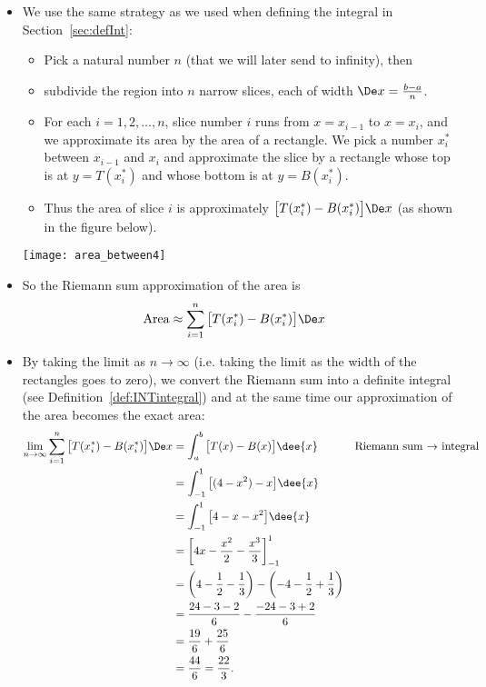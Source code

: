 \begin{eg}
\begin{itemize}
\item We use the same strategy as we used when defining the integral in
Section~\ref{sec:defInt}:
\begin{itemize}
 \item Pick a natural number $n$ (that we will later send to infinity), then
\item subdivide the region into $n$ narrow slices, each of width $\De x=\frac{b-a}{n}$.
\item For each $i=1,2,\dots,n$, slice number $i$ runs from $x=x_{i-1}$ to $x=x_i$, and we
approximate its area by the area of a rectangle. We pick a number $x_i^*$ between
$x_{i-1}$ and $x_i$ and approximate the slice by a rectangle whose top is at $y=T(x_i^*)$
and whose bottom is at $y=B(x_i^*)$.
\item Thus the area of slice $i$ is approximately $\big[T(x_i^*)-B(x_i^*)\big]\De x$ (as
shown in the figure below).
\end{itemize}
\begin{efig}
 \centering
\texttt{[image: area\_between4]}
\end{efig}
\item So the Riemann sum approximation of the area is
\begin{align*}
  \text{Area} &\approx \sum_{i=1}^n  \big[T(x_i^*)-B(x_i^*)\big]\De x
\end{align*}
\item By taking the limit as $n \to \infty$ (i.e. taking the limit as the width of the
rectangles goes to zero), we convert the Riemann sum into a definite integral (see
Definition~\ref{def:INTintegral}) and at the same time our approximation of the area
becomes the exact area:
\begin{align*}
\lim_{n\rightarrow\infty}\sum_{i=1}^n  \big[T(x_i^*)-B(x_i^*)\big]\De x
&=\int_a^b \big[T(x)-B(x)\big]\dee{x} & \text{Riemann sum $\to$ integral}\\
&=\int_{-1}^1\big[(4-x^2)-x\big]\dee{x}\\
&=\int_{-1}^1\big[4-x-x^2\big]\dee{x} \\
&=\bigg[4x - \frac{x^2}{2} - \frac{x^3}{3} \bigg]_{-1}^1\\
&= \left(4 - \frac{1}{2}-\frac{1}{3} \right) - \left(-4-\frac{1}{2}+\frac{1}{3} \right)\\
&= \frac{24-3-2}{6} - \frac{-24-3+2}{6} \\
&= \frac{19}{6} + \frac{25}{6}\\
&= \frac{44}{6} = \frac{22}{3}.
\end{align*}
\end{itemize}
\end{eg}


